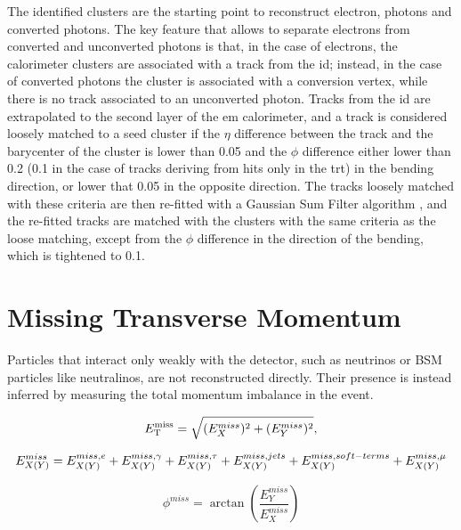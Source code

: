 
The identified clusters are the starting point to reconstruct electron, photons and converted photons. The key feature that allows to separate electrons from converted and unconverted photons is that, in the case of electrons, the calorimeter clusters are associated with a track from the \gls{id}; instead, in the case of converted photons the cluster is associated with a conversion vertex, while there is no track associated to an unconverted photon. Tracks from the \gls{id} are extrapolated to the second layer of the \gls{em} calorimeter, and a track is considered loosely matched to a seed cluster if the $\eta$ difference between the track and the barycenter of the cluster is lower than 0.05 and the $\phi$ difference either lower than 0.2 (0.1 in the case of tracks deriving from hits only in the \gls{trt}) in the bending direction, or lower that 0.05 in the opposite direction. 
The tracks loosely matched with these criteria are then re-fitted with a Gaussian Sum Filter algorithm \cite{ATLAS:2012dma}, and the re-fitted tracks are matched with 
the clusters with the same criteria as the loose matching, except from the $\phi$ difference in the direction of the bending, which is tightened to 0.1.

\section{Missing Transverse Momentum}

Particles that interact only weakly with the detector, such as neutrinos or BSM particles like neutralinos, are not reconstructed directly. 
Their presence is instead inferred by measuring the total momentum imbalance in the event. 

\begin{equation}
E_{\rm T}^{\mathrm{miss}} = \sqrt{(E_{X}^{miss})^{2}  +  (E_{Y}^{miss})^{2}},
\end{equation}

\begin{equation}
E_{X(Y)}^{miss} = E_{X(Y)}^{miss,e} +    E_{X(Y)}^{miss,\gamma} + E_{X(Y)}^{miss,\tau}    \nonumber \\
+ E_{X(Y)}^{miss,jets} + E_{X(Y)}^{miss,soft-terms}  +  E_{X(Y)}^{miss,\mu} 
\label{eq:etm} 
\end{equation}


\begin{equation}
\phi^{miss} = \arctan \left( \frac{E_Y^{miss}}{E_X^{miss}} \right)
\end{equation}




